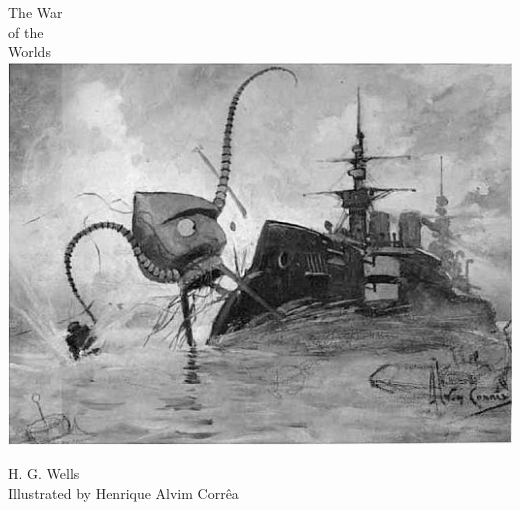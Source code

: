 \documentclass[
a5paper,
BCOR=7mm,
twoside,
DIV=calc,
11pt,
usegeometry,
chapterprefix,
headings=big]{scrbook} %
\newcommand{\moderatelyhuge}{\fontsize{40}{50}\selectfont}
\newcommand{\reasonablyhuge}{\fontsize{30}{40}\selectfont}
\def\coversize{0.8\textwidth}
\newcommand{\HUGE}{\fontsize{50}{60}\selectfont}
\def\coversize{\textwidth}
\newcommand{\HUGE}{\fontsize{60}{70}\selectfont}
\begin{document}
\frontmatter




  \begin{titlepage}
   \recalctypearea

  \begin{center}\mytitlefont
{\HUGE The War}\\
\vspace{0.5cm}
{\moderatelyhuge of the}\\
\vspace{0.2cm}
{\HUGE Worlds}\\
\vspace*{1cm}
\includegraphics[width=\coversize]{painting}\\
 \end{center}
 \vspace*{0.1cm}
 \begin{center}\mytitlefont
{\reasonablyhuge H. G. Wells}\\
\vspace{0.5cm}
{\Huge Illustrated by}
\vspace{0.1cm}
{\Huge Henrique Alvim Corrêa}
\end{center}
  \end{titlepage}
\end{document}
